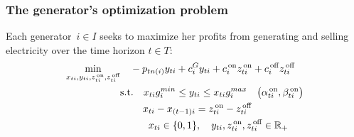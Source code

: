 \documentclass[9pt,a4paper]{article}
\newcommand{\st}{\text{s.t.} \quad}
\newcommand{\on}{^{\,\text{on}}}
\newcommand{\off}{^{\,\text{off}}}
\begin{document}
\subsubsection*{The generator's optimization problem}
Each generator~$i \in I$ seeks to maximize her profits from generating and selling electricity over the time horizon $t \in T$:
\begin{subequations} \label{example:generator:optimization}
\begin{align} 
\min_{x_{ti},y_{ti},z\on_{ti},z\off_{ti}} &\quad  - p_{tn(i)} y_{ti} + c^G_{i} y_{ti} + c\on_{i} z\on_{ti} + c\off_{i} z\off_{ti}  \label{example:generator:objective} \\
&\st x_{ti} g_i^{min} \leq y_{ti} \leq x_{ti} g_i^{max} \quad \big(\alpha\on_{ti},\beta\on_{ti}\big)  \label{example:generator:con:generation} \\
& \hspace{0.8 cm} x_{ti} - x_{(t-1)i} = z\on_{ti} - z\off_{ti} \label{example:generator:con:intertemporal} \\
& \hspace{1 cm} x_{ti} \in \{0,1\}, \quad y_{ti},z\on_{ti},z\off_{ti}  \in \mathbb{R}_+ \nonumber
\end{align}
\end{subequations}
\end{document}
